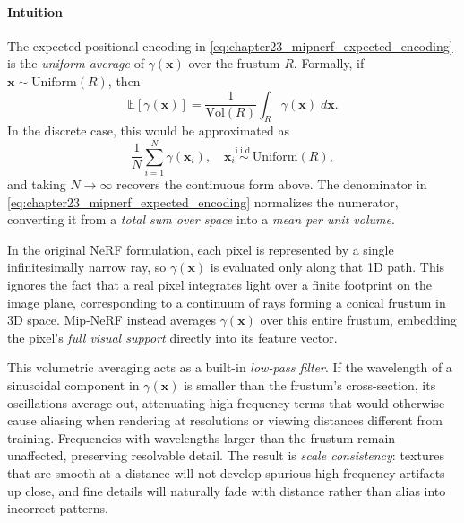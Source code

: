 \begin{enrichment}
\begin{enrichment}
    \paragraph{Intuition}  
    The expected positional encoding in \eqref{eq:chapter23_mipnerf_expected_encoding} is the \emph{uniform average} of \(\gamma(\mathbf{x})\) over the frustum \(R\).  
    Formally, if \(\mathbf{x} \sim \mathrm{Uniform}(R)\), then
    \[
    \mathbb{E}[\gamma(\mathbf{x})] 
    = \frac{1}{\mathrm{Vol}(R)} \int_{R} \gamma(\mathbf{x}) \; d\mathbf{x}.
    \]
    In the discrete case, this would be approximated as  
    \[
    \frac{1}{N} \sum_{i=1}^N \gamma(\mathbf{x}_i), 
    \quad \mathbf{x}_i \stackrel{\text{i.i.d.}}{\sim} \mathrm{Uniform}(R),
    \]
    and taking \(N \to \infty\) recovers the continuous form above.  
    The denominator in \eqref{eq:chapter23_mipnerf_expected_encoding} normalizes the numerator, converting it from a \emph{total sum over space} into a \emph{mean per unit volume}.  
    
    In the original NeRF formulation, each pixel is represented by a single infinitesimally narrow ray, so \(\gamma(\mathbf{x})\) is evaluated only along that 1D path.  
    This ignores the fact that a real pixel integrates light over a finite footprint on the image plane, corresponding to a continuum of rays forming a conical frustum in 3D space.  
    Mip-NeRF instead averages \(\gamma(\mathbf{x})\) over this entire frustum, embedding the pixel’s \emph{full visual support} directly into its feature vector.
    
    \newpage
    
    This volumetric averaging acts as a built-in \emph{low-pass filter}.  
    If the wavelength of a sinusoidal component in \(\gamma(\mathbf{x})\) is smaller than the frustum’s cross-section, its oscillations average out, attenuating high-frequency terms that would otherwise cause aliasing when rendering at resolutions or viewing distances different from training.  
    Frequencies with wavelengths larger than the frustum remain unaffected, preserving resolvable detail.  
    The result is \emph{scale consistency}: textures that are smooth at a distance will not develop spurious high-frequency artifacts up close, and fine details will naturally fade with distance rather than alias into incorrect patterns.
    

\end{enrichment}
\end{enrichment}

